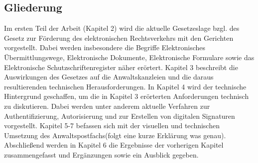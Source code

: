 \subsection{Gliederung}
Im ersten Teil der Arbeit (Kapitel 2) wird die aktuelle Gesetzeslage bzgl. des Gesetz zur Förderung des elektronischen Rechtsverkehrs mit den Gerichten vorgestellt. Dabei werden insbesondere die Begriffe  Elektronisches Übermittlungswege, Elektronische Dokumente, Elektronische Formulare sowie das Elektronische Schutzschriftenregister näher erörtert. Kapitel 3 beschreibt die Auswirkungen des Gesetzes auf die Anwaltskanzleien und die daraus resultierenden technischen Herausforderungen. In Kapitel 4 wird der technische Hintergrund geschaffen, um die in Kapitel 3 erörterten Anforderungen technisch zu diskutieren. Dabei werden unter anderem aktuelle Verfahren zur Authentifizierung, Autorisierung und zur Erstellen von digitalen Signaturen vorgestellt. Kapitel 5-7 befassen sich mit der visuellen und technischen Umsetzung des Anwaltspostfachs(folgt eine kurze Erklärung was genau).  Abschließend werden in Kapitel 6 die Ergebnisse der vorherigen Kapitel zusammengefasst und Ergänzungen sowie ein Ausblick gegeben. 



